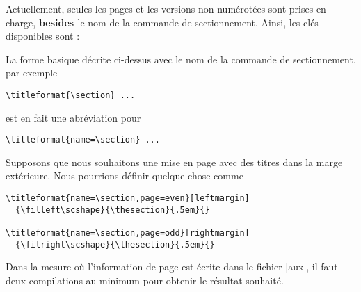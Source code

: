\documentclass[a4paper]{ltxguide}
\newcommand{\trad}[1]{\textbf{\textcolor{orange5}{\noindent\ding{54} #1 \ding{54}}}}
\begin{document}
Actuellement, seules les pages et les versions non numérotées sont prises en charge, 
\trad{besides} le nom de la commande de sectionnement. Ainsi, les clés disponibles sont :
La forme basique décrite ci-dessus avec le nom de la commande de sectionnement, par exemple
\begin{verbatim}
\titleformat{\section} ...
\end{verbatim}
est en fait une abréviation pour
\begin{verbatim}
\titleformat{name=\section} ...
\end{verbatim}
Supposons que nous souhaitons une mise en page avec des titres dans la marge extérieure. 
Nous pourrions définir quelque chose comme 
\begin{verbatim}
\titleformat{name=\section,page=even}[leftmargin]
  {\filleft\scshape}{\thesection}{.5em}{}

\titleformat{name=\section,page=odd}[rightmargin]
  {\filright\scshape}{\thesection}{.5em}{}
\end{verbatim}
Dans la mesure où l'information de page est écrite dans le fichier |aux|, il faut deux 
compilations au minimum pour obtenir le résultat souhaité.
\end{document}
